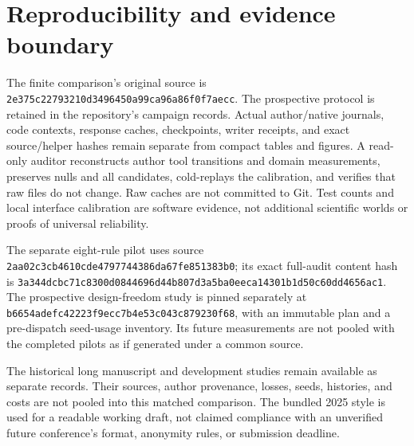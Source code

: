 \documentclass{article}
\begin{document}



\appendix
\section{Reproducibility and evidence boundary}
The finite comparison's original source is
\texttt{2e375c22793210d3496450a99ca96a86f0f7aecc}.
The prospective protocol is retained in the repository's campaign records.
Actual author/native journals, code contexts, response caches, checkpoints,
writer receipts, and exact source/helper hashes remain separate from compact
tables and figures. A read-only auditor reconstructs author tool transitions
and domain measurements, preserves nulls and all candidates, cold-replays the
calibration, and verifies that raw files do not change. Raw caches are not
committed to Git. Test counts and local interface calibration are software
evidence, not additional scientific worlds or proofs of universal reliability.

{\raggedright
The separate eight-rule pilot uses source
\texttt{2aa02c3cb4610cde4797744386da67fe851383b0}; its exact full-audit
content hash is
\texttt{3a344dcbc71c8300d0844696d44b807d3}\allowbreak\texttt{a5ba0eeca14301b1d50c60dd4656ac1}.
The prospective design-freedom study is pinned separately at
\texttt{b6654adefc42223f9ecc7b4e53c043c879230f68}, with an immutable
plan and a pre-dispatch seed-usage inventory. Its future measurements are not
pooled with the completed pilots as if generated under a common source.\par}

The historical long manuscript and development studies remain available as
separate records. Their sources, author provenance, losses, seeds, histories,
and costs are not pooled into this matched comparison. The bundled 2025 style
is used for a readable working draft, not claimed compliance with an unverified
future conference's format, anonymity rules, or submission deadline.
\end{document}
